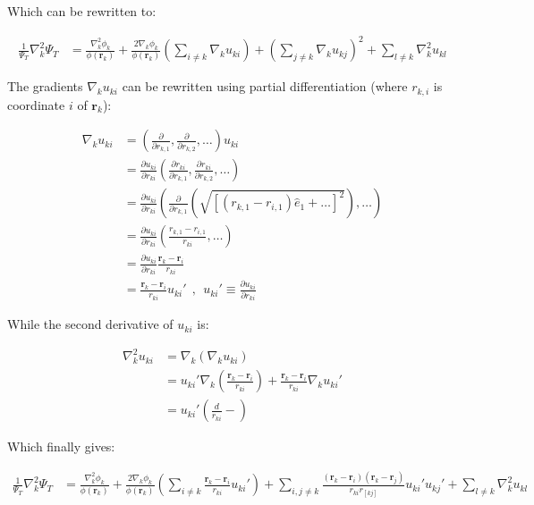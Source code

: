 \documentclass[english, a4paper]{article}
\newcommand{\bm}[1]{\mathbf{#1}}
\begin{document}
Which can be rewritten to:

\begin{align}
	\frac{1}{\Psi_T}\nabla_k^2\Psi_T &= \frac{\nabla_k^2\phi_k}{\phi(\bm{r}_k)} + \frac{2\nabla_k\phi_k}{\phi(\bm{r}_k)}\left(\sum_{i\neq k}\nabla_ku_{ki} \right) + \left(\sum_{j\neq k}\nabla_ku_{kj} \right)^2 + \sum_{l\neq k}\nabla_k^2u_{kl}
\end{align}

The gradients $\nabla_k u_{ki}$ can be rewritten using partial differentiation (where $r_{k,i}$ is coordinate $i$ of $\bm{r}_k$):

\begin{align*}
	\nabla_k u_{ki} &= \left(\frac{\partial}{\partial r_{k,1}}, \frac{\partial}{\partial r_{k,2}}, \ldots\right)u_{ki}\\
	&= \frac{\partial u_{ki}}{\partial r_{ki}}\left(\frac{\partial r_{ki}}{\partial r_{k,1}}, \frac{\partial r_{ki}}{\partial r_{k,2}}, \ldots\right)\\
	&= \frac{\partial u_{ki}}{\partial r_{ki}}\left( \frac{\partial}{\partial r_{k,1}}\left(\sqrt{\left[(r_{k,1}-r_{i,1})\hat{e}_1 + \ldots\right]^2}\right), \ldots \right)\\
	&= \frac{\partial u_{ki}}{\partial r_{ki}}\left(\frac{r_{k,1} - r_{i,1}}{r_{ki}}, \ldots \right)\\
	&= \frac{\partial u_{ki}}{\partial r_{ki}}\frac{\bm{r}_k - \bm{r}_i}{r_{ki}}\\
	&= \frac{\bm{r}_k - \bm{r}_i}{r_{ki}} u_{ki}' \:\:,\:\:  u_{ki}'\equiv \frac{\partial u_{ki}}{\partial r_{ki}}
\end{align*}

While the second derivative of $u_{ki}$ is:

\begin{align*}
	\nabla_k^2 u_{ki} &= \nabla_k(\nabla_ku_{ki})\\
	&= u_{ki}'\nabla_k\left(\frac{\bm{r}_k - \bm{r}_i}{r_{ki}}\right) + \frac{\bm{r}_k - \bm{r}_i}{r_{ki}}\nabla_k u_{ki}'\\
	&= u_{ki}' \left(\frac{d}{r_{ki}} - \right)
\end{align*}

Which finally gives:

\begin{align}
\frac{1}{\Psi_T}\nabla_k^2\Psi_T &= \frac{\nabla_k^2\phi_k}{\phi(\bm{r}_k)} + \frac{2\nabla_k\phi_k}{\phi(\bm{r}_k)}\left(\sum_{i\neq k} \frac{\bm{r}_k - \bm{r}_i}{r_{ki}} u_{ki}' \right) + \sum_{i,j\neq k}\frac{(\bm{r}_k - \bm{r}_i)(\bm{r}_k - \bm{r}_j)}{r_{ki}r_[kj]}u_{ki}'u_{kj}' + \sum_{l\neq k}\nabla_k^2u_{kl}
\end{align}
\end{document}
